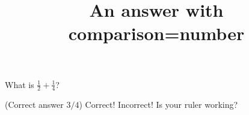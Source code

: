 \documentclass[hidesidemenu]{webquiz}
\title{An answer with comparison=number}
\begin{document}
  \begin{question}     %
      What is $\frac12+\frac14$?

      (Correct answer $3/4$)
     \whenRight Correct!
     \whenWrong Incorrect! Is your ruler working?
  \end{question}
\end{document}
